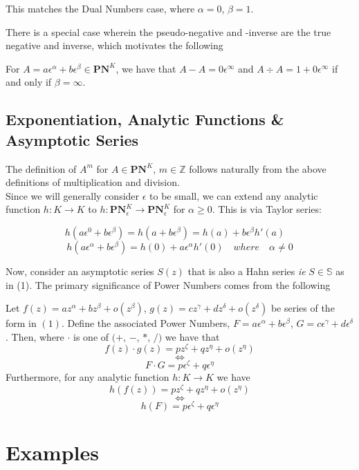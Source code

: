 \documentclass[acmsmall]{acmart}
\begin{document}
This matches the Dual Numbers case, where $\alpha = 0$, $\beta = 1$.

There is a special case wherein the pseudo-negative and -inverse are the true negative and inverse, which motivates the following
\begin{proposition}
For $A = a\epsilon^\alpha + b\epsilon^\beta \in \mathbf{PN}^K$, we have that $A-A=0\epsilon^\infty$ and $A \div A = 1 + 0\epsilon^\infty$ if and only if $\beta = \infty$.
\end{proposition}

\subsection{Exponentiation, Analytic Functions \& Asymptotic Series}

The definition of $A^m$ for $A \in \mathbf{PN}^K$, $m \in \mathbb{Z}$ follows naturally from the above definitions of multiplication and division. \\
Since we will generally consider $\epsilon$ to be small, we can extend any analytic function $h:K \rightarrow K$ to $h:\mathbf{PN}^K_{\epsilon} \rightarrow \mathbf{PN}^K_{\epsilon}$ for $\alpha \geq 0$. This is via Taylor series:

$$h(a\epsilon^0+b\epsilon^\beta) = h(a+b\epsilon^\beta) = h(a) + b\epsilon^\beta h'(a) \quad$$
$$h(a\epsilon^\alpha+b\epsilon^\beta) = h(0) + a\epsilon^\alpha h'(0) \quad where \quad \alpha \neq 0$$

Now, consider an asymptotic series $S(z)$ that is also a Hahn series \textit{ie} $S \in \mathbb{S}$ as in (1). The primary significance of Power Numbers comes from the following 
\begin{proposition}
	Let $f(z) = az^\alpha + bz^\beta + o(z^\beta)$,	$g(z) = cz^\gamma + dz^\delta + o(z^\delta)$ be series of the form in $(1)$.
	Define the associated Power Numbers, $F = a\epsilon^\alpha + b\epsilon^\beta$, $G = c\epsilon^\gamma + d\epsilon^\delta$.
	Then, where $\cdot$ is one of $(+$, $-$, $*$, $/)$ we have that 
	$$f(z) \cdot g(z) = pz^\zeta + qz^\eta + o(z^\eta)$$
	$$\Leftrightarrow$$
	$$F \cdot G = p\epsilon^\zeta + q\epsilon^\eta$$
	Furthermore, for any analytic function $h:K \rightarrow K$ we have
	$$h(f(z)) = pz^\zeta + qz^\eta + o(z^\eta)$$ 
	$$\Leftrightarrow$$
	$$h(F) = p\epsilon^\zeta + q\epsilon^\eta$$
\end{proposition}

\section{Examples}
\end{document}
